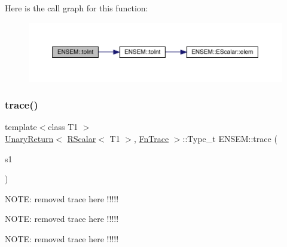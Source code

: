 Here is the call graph for this function\+:\nopagebreak
\begin{figure}[H]
\begin{center}
\leavevmode
\includegraphics[width=350pt]{d9/ded/group__rscalar_ga7507e0e1da7cf75743141d70fd7150c8_cgraph}
\end{center}
\end{figure}
\mbox{\label{group__rscalar_ga0d92a68fbffd9e97af74d7c35b92536b}} 
\subsubsection{\texorpdfstring{trace()}{trace()}}
{\footnotesize\ttfamily template$<$class T1 $>$ \\
\mbox{\hyperlink{structENSEM_1_1UnaryReturn}{Unary\+Return}}$<$ \mbox{\hyperlink{classENSEM_1_1RScalar}{R\+Scalar}}$<$ T1 $>$, \mbox{\hyperlink{structENSEM_1_1FnTrace}{Fn\+Trace}} $>$\+::Type\+\_\+t E\+N\+S\+E\+M\+::trace (\begin{DoxyParamCaption}\item[{const \mbox{\hyperlink{classENSEM_1_1RScalar}{R\+Scalar}}$<$ T1 $>$ \&}]{s1 }\end{DoxyParamCaption})\hspace{0.3cm}{\ttfamily [inline]}}

N\+O\+TE\+: removed trace here !!!!!

N\+O\+TE\+: removed trace here !!!!!

N\+O\+TE\+: removed trace here !!!!! \mbox{\label{group__rscalar_ga04705f685567963d28806500dd6dde85}} 
